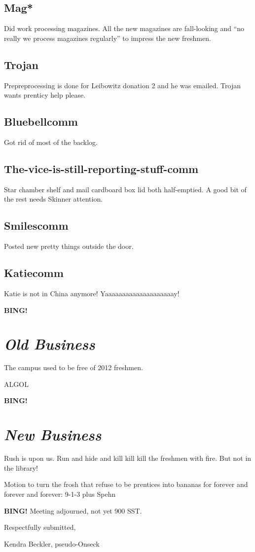 \documentclass[10pt]{article}
\newcommand{\bing}{{\bf BING!} }
\newcommand{\goto}[1]{\bing \vskip 12pt \section*{{\em{#1}}}}
\newcommand{\ps}{ plus Spehn\xspace}
\begin{document}
\subsection*{Mag*}

Did work processing magazines.  All the new magazines are fall-looking and ``no really we process magazines regularly'' to impress the new freshmen.

\subsection*{Trojan}

Prepreprocessing is done for Leibowitz donation 2 and he was emailed.  Trojan wants prenticy help please.

\subsection*{Bluebellcomm}

Got rid of most of the backlog.

\subsection*{The-vice-is-still-reporting-stuff-comm}

Star chamber shelf and mail cardboard box lid both half-emptied.  A good bit of the rest needs Skinner attention.

\subsection*{Smilescomm}

Posted new pretty things outside the door.

\subsection*{Katiecomm}

Katie is not in China anymore!  Yaaaaaaaaaaaaaaaaaaaay!

\goto{Old Business}

The campus used to be free of 2012 freshmen.

ALGOL

\goto{New Business}

Rush is upon us.  Run and hide and kill kill kill the freshmen with fire.  But not in the library!

Motion to turn the frosh that refuse to be prentices into bananas for forever and forever and forever: 9-1-3 \ps

\bing
\noindent
Meeting adjourned, not yet 900 SST.

\vspace{18pt}

\centerline{Respectfully submitted,}
\centerline{Kendra Beckler, pseudo-Onseck}
\end{document}
